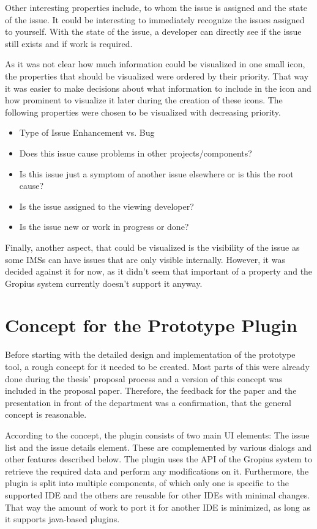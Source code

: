 Other interesting properties include, to whom the issue is assigned and the state of the issue.
It could be interesting to immediately recognize the issues assigned to yourself.
With the state of the issue, a developer can directly see if the issue still exists and if work is required.

As it was not clear how much information could be visualized in one small icon, 
the properties that should be visualized were ordered by their priority.
That way it was easier to make decisions about what information to include in the icon and how prominent to visualize it later during the creation of these icons.
The following properties were chosen to be visualized with decreasing priority.
\begin{itemize}
	\item Type of Issue
	\subitem Enhancement vs. Bug
	\item Does this issue cause problems in other projects/components?
	\item Is this issue just a symptom of another issue elsewhere or is this the root cause?
	\item Is the issue assigned to the viewing developer?
	\item Is the issue new or work in progress or done?
\end{itemize}
Finally, another aspect, that could be visualized is the visibility of the issue as some \glspl{IMS} can have issues that are only visible internally.
However, it was decided against it for now, as it didn't seem that important of a property and the Gropius system currently doesn't support it anyway.

\section{Concept for the Prototype Plugin}
\label{sec:ch3:s3}
Before starting with the detailed design and implementation of the prototype tool, a rough concept for it needed to be created.
Most parts of this were already done during the thesis' proposal process and a version of this concept was included in the proposal paper.
Therefore, the feedback for the paper and the presentation in front of the department was a confirmation, that the general concept is reasonable.

According to the concept, the plugin consists of two main \gls{UI} elements: The issue list and the issue details element.
These are complemented by various dialogs and other features described below.
The plugin uses the \gls{API} of the \gls{Gropius} system to retrieve the required data and perform any modifications on it.
Furthermore, the plugin is split into multiple components, 
of which only one is specific to the supported \gls{IDE} 
and the others are reusable for other \glspl{IDE} with minimal changes.
That way the amount of work to port it for another \gls{IDE} is minimized,
as long as it supports \gls{java}-based plugins.

